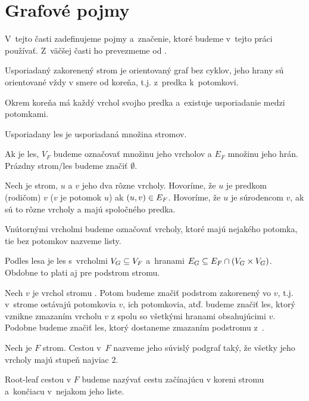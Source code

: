 \section{Grafové pojmy}
\label{kap:grafy}

V~tejto časti zadefinujeme pojmy a~značenie, ktoré budeme v~tejto práci používať.
Z~väčšej časti ho prevezmeme od \citet{RTED}.

\begin{definice}\label{def:strom}
  Usporiadaný zakorenený strom je orientovaný graf bez cyklov,
  jeho hrany sú orientované vždy v smere od koreňa, t.j. z~predka k~potomkovi.

  Okrem koreňa má každý vrchol svojho predka a~existuje usporiadanie medzi potomkami.

  Usporiadany les je usporiadaná množina stromov.
\end{definice}

Ak  je les, $V_F$ budeme označovať množinu jeho vrcholov a $E_F$ množinu jeho hrán.
Prázdny strom/les budeme značiť $\emptyset$.

\begin{definice}
  \label{def:stromove_pojmy}
  Nech  je strom, $u$ a $v$ jeho dva rôzne vrcholy.
  Hovoríme, že $u$ je predkom (rodičom) $v$ ($v$ je potomok $u$) ak $(u, v) \in E_{F}$.
  Hovoríme, že $u$ je súrodencom $v$, ak sú to rôzne vrcholy a majú spoločného predka.
\end{definice}

Vnútornými vrcholmi budeme označovať vrcholy, ktoré majú nejakého potomka,
tie bez potomkov nazveme listy.

Podles lesa  je les  s~vrcholmi $V_{G} \subseteq V_{F}$
a~hranami $E_{G} \subseteq E_{F} \cap (V_{G} \times V_{G})$.
Obdobne to plati aj pre podstrom stromu.

Nech $v$ je vrchol stromu . Potom  budeme značiť podstrom  zakorenený vo $v$,
t.j. v~strome ostávajú potomkovia $v$, ich potomkovia, atď.
 budeme značiť les, ktorý vznikne zmazaním vrcholu $v$ z  spolu so
všetkými hranami obsahujúcimi $v$. Podobne  budeme značiť les, ktorý
dostaneme zmazaním podstromu  z~.

\begin{definice}
  Nech je $F$ strom. Cestou v~$F$ nazveme jeho súvislý podgraf taký, že všetky jeho vrcholy
  majú stupeň najviac 2.

  Root-leaf cestou v $F$ budeme nazývať cestu začínajúcu v koreni stromu \sloppy\mbox{a končiacu}
  v~nejakom jeho liste.
\end{definice}

